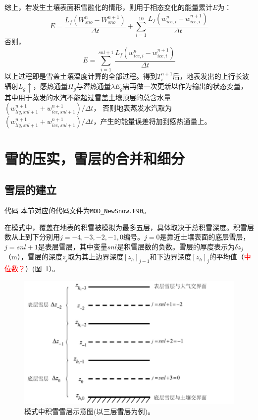 综上，若发生土壤表面积雪融化的情形，则用于相态变化的能量累计$E$为：
\begin{equation}
E=\frac{L_{f}\left(W_{sno}^{n}-W_{sno}^{n+1}\right)}{\Delta t}+\sum_{i=1}^{10} \frac{L_{f}\left(w_{ice, i}^{n}-w_{ice, i}^{n+1}\right)}{\Delta t}
\end{equation}
否则，
\begin{equation}
E=\sum_{i=1}^{s n l+1} \frac{L_{f}\left(w_{ice, i}^{n}-w_{ice, i}^{n+1}\right)}{\Delta t}
\end{equation}
以上过程即是雪盖土壤温度计算的全部过程。得到$T_i^{n+1}$后，地表发出的上行长波辐射$L_g\uparrow$，感热通量$H_g$与潜热通量$\lambda E_g$需再做一次更新以作为输出的状态变量，
其中用于蒸发的水汽不能超过雪盖土壤顶层的总含水量$\left(w_{liq,snl+1}^{n+1}+w_{ice,snl+1}^{n+1}\right)/\Delta t$，
否则地表蒸发水汽取为$\left(w_{liq,snl+1}^{n+1}+w_{ice,snl+1}^{n+1}\right)/\Delta t$，产生的能量误差将加到感热通量上。


\section{雪的压实，雪层的合并和细分}
\subsection{雪层的建立}
\begin{mymdframed}{代码}
本节对应的代码文件为\texttt{MOD\_NewSnow.F90}。
\end{mymdframed}

在模式中，覆盖在地表的积雪被模拟为最多五层，具体取决于总积雪深度。积雪层数从上到下分别用$j = −4, −3, −2, −1, 0$编号。$j = 0$是靠近土壤表面的底层雪层，$j = snl + 1$是表层雪层，其中变量$snl$是积雪层数的负数。雪层的厚度表示为$\delta z_j$（m），雪层的深度$z_j$取为其上边界深度$\left[z_h\right]_{j-1}$和下边界深度$\left[z_h\right]_j$的平均值（\textcolor{red}{中位数？}）(图~\ref{fig:模式中积雪雪层示意图}）。
{
\begin{figure}[]
\centering
\includegraphics{Figures/雪盖土壤热力过程/模式中积雪雪层示意图.png}
\caption{模式中积雪雪层示意图(以三层雪层为例)。}
\label{fig:模式中积雪雪层示意图}
\end{figure}
}

